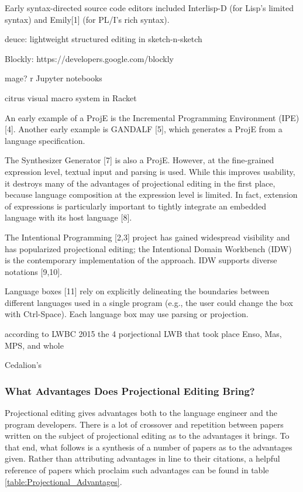 Early syntax-directed source code editors included Interlisp-D (for Lisp’s limited syntax) and Emily[1] (for PL/I’s rich syntax).

deuce: lightweight structured editing in sketch-n-sketch

Blockly: https://developers.google.com/blockly

mage? r Jupyter notebooks

citrus
visual macro system in Racket


An early example of a ProjE is the Incremental Programming Environment (IPE) [4].
Another early example is GANDALF [5], which generates a ProjE from a language specification.

The Synthesizer Generator [7] is also a ProjE.
However, at the fine-grained expression level, textual input and parsing is used.
While this improves usability, it destroys many of the advantages of projectional editing in the first place, because language composition at the expression level is limited.
In fact, extension of expressions is particularly important to tightly integrate an embedded language with its host language [8].

The Intentional Programming [2,3] project has gained widespread visibility and has popularized projectional editing; the Intentional Domain Workbench (IDW) is the contemporary implementation of the approach.
IDW supports diverse notations [9,10].


Language boxes [11] rely on explicitly delineating the boundaries between different languages used in a single program (e.g., the user could change the box with Ctrl-Space).
Each language box may use parsing or projection.


according to LWBC 2015 the 4 porjectional LWB that took place Enso, Mas, MPS, and whole


Cedalion's 







\subsubsection{What Advantages Does Projectional Editing Bring?}

Projectional editing gives advantages both to the language engineer and the program developers.
There is a lot of crossover and repetition between papers written on the subject of projectional editing as to the advantages it brings.
To that end, what follows is a synthesis of a number of papers as to the advantages given.
Rather than attributing advantages in line to their citations, a helpful reference of papers which proclaim such advantages can be found in table \ref{table:Projectional_Advantages}.

